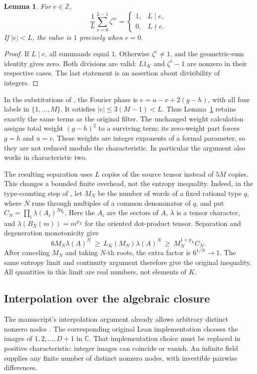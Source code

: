 \documentclass[11pt]{article}
\newtheorem{lemma}[theorem]{Lemma}
\theoremstyle{remark}
\newcommand{\C}{\mathbb C}
\numberwithin{equation}{section}
\begin{document}
\begin{lemma}\label{lem:fourier}
For $e\in\mathbb Z$,
\[
\frac1L\sum_{r=0}^{L-1}\zeta^{re}
=\begin{cases}1,&L\mid e,\\0,&L\nmid e.\end{cases}
\]
If $|e|<L$, the value is $1$ precisely when $e=0$.
\end{lemma}
\begin{proof}
If $L\mid e$, all summands equal $1$. Otherwise $\zeta^e\ne1$,
and the geometric-sum identity gives zero. Both divisions are valid:
$L1_K$ and $\zeta^e-1$ are nonzero in their respective cases.
The last statement is an assertion about divisibility of integers.
\end{proof}

In the substitutions of \cite[Proposition~3.1]{OAI}, the Fourier
phase is $e=u-v+2(g-h)$, with all four labels in $\{1,\ldots,M\}$.
It satisfies $|e|\leq3(M-1)<L$. Thus Lemma~\ref{lem:fourier}
retains exactly the same terms as the original filter. The unchanged
weight calculation assigns total weight $(g-h)^2$ to a surviving
term; its zero-weight part forces $g=h$ and $u=v$. These weights are
integer exponents of a formal parameter, so they are not reduced
modulo the characteristic. In particular the argument also works
in characteristic two.

The resulting separation uses $L$ copies of the source tensor instead
of $5M$ copies. This changes a bounded finite overhead, not the
entropy inequality. Indeed, in the type-counting step of
\cite[Corollary~3.2]{OAI}, let $M_N$ be the number of words of a
fixed rational type $q$, where $N$ runs through multiples of a common
denominator of $q$, and put
$C_N=\prod_i\lambda(A_i)^{Nq_i}$. Here the $A_i$ are the sectors
of $A$, $\lambda$ is a tensor character, and
$\lambda(B_X(m))=m^{p_X}$ for the oriented dot-product tensor.
Separation and degeneration monotonicity give
\[
6M_N\lambda(A)^N\ \geq\ L_K(M_N)\lambda(A)^N
\ \geq\ M_N^{1+p_X}C_N.
\]
After canceling $M_N$ and taking $N$-th roots, the extra factor is
$6^{1/N}\to1$. The same entropy limit and continuity argument
therefore give the original inequality. All quantities in this
limit are real numbers, not elements of $K$.

\subsection{Interpolation over the algebraic closure}

The manuscript's interpolation argument already allows arbitrary
distinct nonzero nodes \cite[Lemma~2.3]{OAI}. The corresponding
original Lean implementation chooses the images of
$1,2,\ldots,D+1$ in $\C$. That implementation choice must be
replaced in positive characteristic: integer images can coincide
or vanish. An infinite field supplies any finite number of distinct
nonzero nodes, with invertible pairwise differences.
\end{document}
